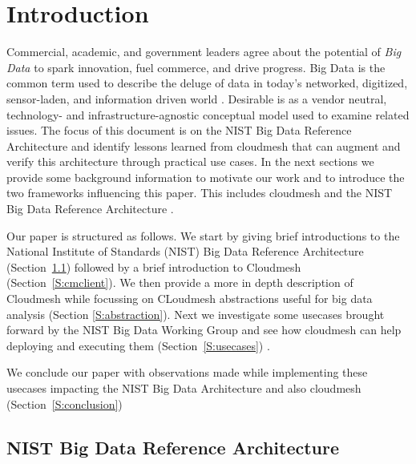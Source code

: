 \section{Introduction}

Commercial, academic, and government leaders agree about the potential
of {\em Big Data} to spark innovation, fuel commerce, and drive
progress. Big Data is the common term used to describe the deluge of
data in today’s networked, digitized, sensor-laden, and information
driven world \cite{nist-bd}. Desirable is as a vendor neutral,
technology- and infrastructure-agnostic conceptual model used to
examine related issues.  The focus of this document is on the NIST Big
Data Reference Architecture and identify lessons learned from
cloudmesh that can augment and verify this architecture through
practical use cases. In the next sections we provide some background
information to motivate our work and to introduce the two frameworks
influencing this paper. This includes cloudmesh \cite{las12-cloud}
\cite{github-cloudmesh-client} and the NIST Big Data Reference
Architecture \cite{nist-bd}.  

Our paper is structured as follows. We start by giving brief
introductions to the National Institute of Standards (NIST) Big Data
Reference Architecture (Section~\ref{S:NBDarch}) followed by a brief
introduction to Cloudmesh (Section~\ref{S:cmclient}).  We then provide
a more in depth description of Cloudmesh while focussing on CLoudmesh
abstractions useful for big data analysis (Section
\ref{S:abstraction}). Next we investigate some usecases brought
forward by the NIST Big Data Working Group and see how cloudmesh can
help deploying and executing them (Section~\ref{S:usecases}) .

We conclude our paper with observations made while implementing these
usecases impacting the NIST Big Data Architecture and also cloudmesh
(Section~\ref{S:conclusion})


\subsection{NIST Big Data Reference Architecture}
\label{S:NBDarch}

